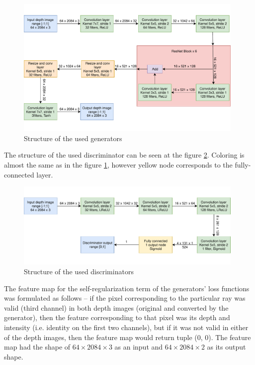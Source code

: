 \begin{figure}
\centering
\includegraphics[keepaspectratio, width=0.98\textwidth]{img/gen.pdf}
\caption{Structure of the used generators}
\label{genstruct}
\end{figure}

The structure of the used discriminator can be seen at the figure \ref{disstruct}. Coloring is almost the same as in the figure \ref{genstruct}, however yellow node corresponds to the fully-connected layer.

\begin{figure}
\centering
\includegraphics[keepaspectratio, width=0.98\textwidth]{img/disc.pdf}
\caption{Structure of the used discriminators}
\label{disstruct}
\end{figure}

The feature map for the self-regularization term of the generators' loss functions was formulated as follows -- if the pixel corresponding to the particular ray was valid (third channel) in both depth images (original and converted by the generator), then the feature corresponding to that pixel was its depth and intensity (i.e. identity on the first two channels), but if it was not valid in either of the depth images, then the feature map would return tuple (0, 0). The feature map had the shape of $64\times2084\times3$ as an input and $64\times2084\times2$ as its output shape.

